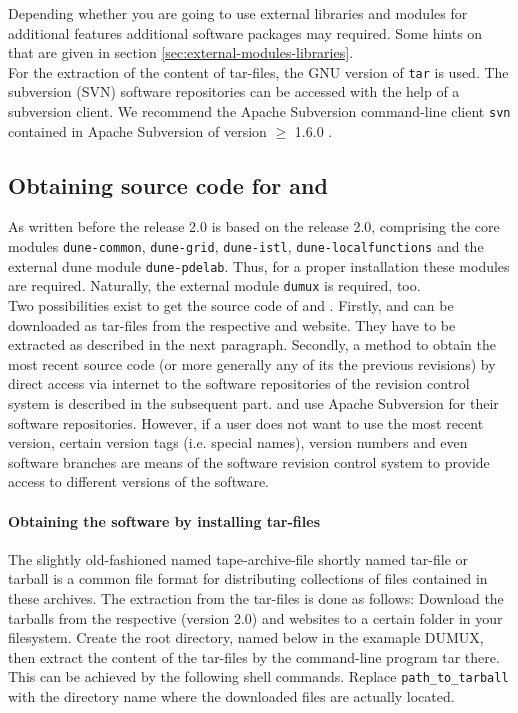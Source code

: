 Depending whether you are going to use external libraries and modules for additional \Dune features 
additional software packages  may required. Some hints on that are given in section \ref{sec:external-modules-libraries}.\\

For the extraction of the content of tar-files, the GNU version of \texttt{tar} is used.
The subversion (SVN) software repositories can be accessed with the help of a subversion client. We recommend the Apache Subversion command-line client \texttt{svn}
contained in Apache Subversion of version $\geqslant$ 1.6.0 \cite{APACHE-SUBVERSION-HP}. 

\subsection{Obtaining source code for \Dune and \Dumux}
As written before the \Dumux release 2.0 is based on the \Dune release 2.0, comprising the core modules 
\texttt{dune-common}, \texttt{dune-grid}, \texttt{dune-istl}, \texttt{dune-localfunctions} and the external dune
module \texttt{dune-pdelab}. Thus, for a proper \Dumux installation these modules are required.
Naturally, the external \Dune module \texttt{dumux} is required, too.\\

Two possibilities exist to get the source code of \Dune and \Dumux.
Firstly, \Dune and \Dumux can be downloaded as tar-files from the respective {\Dune} and {\Dumux} website. They have to be extracted as described in the next paragraph.
Secondly, a method to obtain the most recent source code (or more generally any of its the previous revisions) by direct access via internet to the software repositories of the revision control system is described in the subsequent part. \Dune and \Dumux use Apache Subversion for their software repositories. However, if a user does not want to use the most recent version,
certain version tags (i.e. special names), version numbers and even software branches are means of the software revision control system to provide access to different versions of the software.

\paragraph{Obtaining the software by installing tar-files}
The slightly old-fashioned named tape-archive-file shortly named tar-file or tarball is a common file format for distributing collections of files contained in these archives.
The extraction from the tar-files is done as follows: 
Download the tarballs from the respective \Dune (version 2.0) and \Dumux websites to a certain folder in your filesystem.
Create the {\Dune} root directory, named below in the examaple DUMUX, then extract the content of the tar-files by the command-line program tar there.
This can be achieved by the following shell commands. Replace \texttt{path\_to\_tarball} with the directory name where the downloaded files are actually located.

